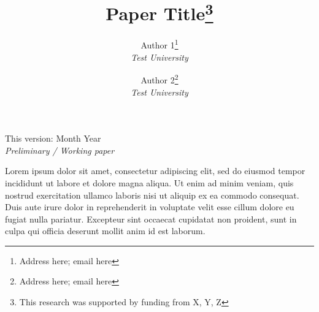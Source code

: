 \documentclass[letterpaper,12pt,leqno]{article}
\newcommand{\bib}{bibliography.bib}
\begin{document}
\title{Paper Title\thanks{This research was supported by funding from X, Y, Z}}


\author{
	{\large {Author 1\thanks{Address here; email here}}} \\
	\textit{Test University}
	\and 
	{\large {Author 2\thanks{Address here; email here}}} \\
	\textit{Test University}
}
\date{} %



\begin{titlepage}\maketitle

	\begin{center}
		\vspace{-2em}
		This version: Month Year \\
		\textit{Preliminary / Working paper}
	\end{center}

Lorem ipsum dolor sit amet, consectetur adipiscing elit, sed do eiusmod tempor incididunt ut labore et dolore magna aliqua. Ut enim ad minim veniam, quis nostrud exercitation ullamco laboris nisi ut aliquip ex ea commodo consequat. Duis aute irure dolor in reprehenderit in voluptate velit esse cillum dolore eu fugiat nulla pariatur. Excepteur sint occaecat cupidatat non proident, sunt in culpa qui officia deserunt mollit anim id est laborum.

\end{titlepage}















\newpage 
\appendix 

\end{document}
